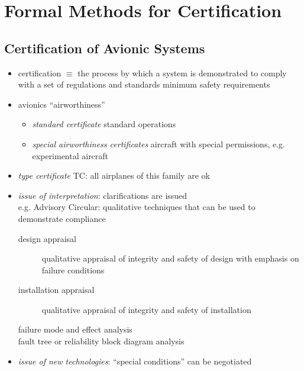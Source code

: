 \documentclass[a4paper, 10pt]{article}
\begin{document}

\section*{Formal Methods for Certification}
\subsection*{Certification of Avionic Systems}
\begin{itemize}
    \item certification $\equiv$ the process by which a system is demonstrated to comply with a set of regulations and standards \follows minimum safety requirements
    \item avionics \follows ``airworthiness''
    \begin{itemize}
        \item \emph{standard certificate} standard operations
        \item \emph{special airworthiness certificates} aircraft with special permissions, e.g. experimental aircraft
    \end{itemize}
    \item \emph{type certificate} TC: all airplanes of this family are ok
    \item \emph{issue of interpretation}: clarifications are issued\\
    e.g. Advisory Circular: qualitative techniques that can be used to demonstrate compliance
    \begin{description}
        \item[design appraisal] qualitative appraisal of integrity and safety of design with emphasis on failure conditions
        \item[installation appraisal] qualitative appraisal of integrity and safety of installation
        \item[failure mode and effect analysis]
        \item[fault tree or reliability block diagram analysis]
    \end{description}
    \item \emph{issue of new technologies}: ``special conditions'' can be negotiated
\end{itemize}
\end{document}

